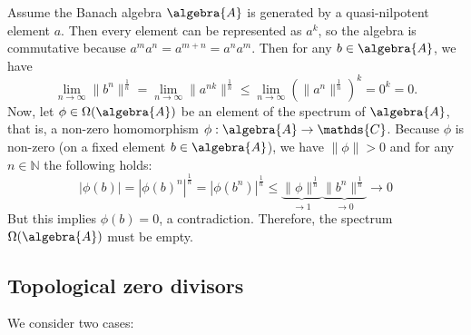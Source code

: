 \documentclass[a4paper]{article}
\begin{document}
Assume the Banach algebra $\algebra{A}$ is generated by a quasi-nilpotent element $a$.
Then every element can be represented as $a^k$, so the algebra is commutative because $a^m a^n = a^{m + n} = a^n a^m$.
Then for any $b \in \algebra{A}$, we have
\begin{equation*}
    \lim_{n \to \infty} \|b^n\|^\frac{1}{n} = \lim_{n \to \infty} \|a^{nk}\|^\frac{1}{n} \leq \lim_{n \to \infty} (\|a^n\|^\frac{1}{n})^k = 0^k = 0\text{.}
\end{equation*}
Now, let $\phi \in \Omega(\algebra{A})$ be an element of the spectrum of $\algebra{A}$, that is, a non-zero homomorphism $\phi: \algebra{A} \to \mathds{C}$. Because $\phi$ is non-zero (on a fixed element $b \in \algebra{A}$), we have $\|\phi\| > 0$ and for any $n \in \mathds{N}$ the following holds:
\begin{equation*}
    |\phi(b)| = |\phi(b)^{n}|^{\frac{1}{n}} = |\phi(b^n)|^\frac{1}{n} \leq \underbrace{\|\phi\|^{\frac{1}{n}}}_{\to 1} \underbrace{\|b^n\|^\frac{1}{n}}_{\to 0} \to 0 
\end{equation*}
But this implies $\phi(b) = 0$, a contradiction.
Therefore, the spectrum $\Omega(\algebra{A})$ must be empty.



\setcounter{subsection}{8}
\subsection{Topological zero divisors}

We consider two cases:
\end{document}
